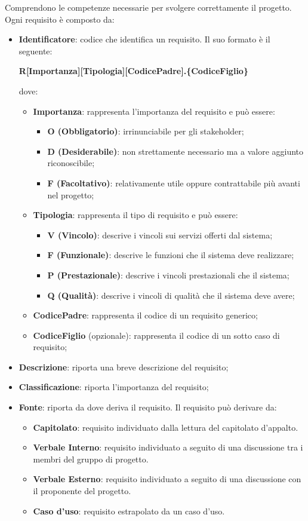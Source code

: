 Comprendono le competenze necessarie per svolgere correttamente il progetto.\\
Ogni requisito è composto da:
\begin{itemize}
\item \textbf{Identificatore}: codice che identifica un requisito. Il suo formato è il seguente:
\begin{center}
\textbf{R[Importanza][Tipologia][CodicePadre].\{CodiceFiglio\}}\\
\end{center}
dove:
\begin{itemize}
\item \textbf{Importanza}: rappresenta l'importanza del requisito e può essere:
\begin{itemize}
\item \textbf{O (Obbligatorio)}: irrinunciabile per gli stakeholder;
\item \textbf{D (Desiderabile)}: non strettamente necessario ma a valore aggiunto riconoscibile;
\item \textbf{F (Facoltativo)}: relativamente utile oppure contrattabile più avanti nel progetto;
\end{itemize}
\item \textbf{Tipologia}: rappresenta il tipo di requisito e può essere:
\begin{itemize}
\item \textbf{V (Vincolo)}: descrive i vincoli sui servizi offerti dal sistema;
\item \textbf{F (Funzionale)}: descrive le funzioni che il sistema deve realizzare;
\item \textbf{P (Prestazionale)}: descrive i vincoli prestazionali che il sistema;
\item \textbf{Q (Qualità)}: descrive i vincoli di qualità che il sistema deve avere;
\end{itemize}
\item \textbf{CodicePadre}: rappresenta il codice di un requisito generico;
\item \textbf{CodiceFiglio} (opzionale): rappresenta il codice di un sotto caso di requisito;
\end{itemize}
\item \textbf{Descrizione}: riporta una breve descrizione del requisito;
\item \textbf{Classificazione}: riporta l'importanza del requisito;
\item \textbf{Fonte}: riporta da dove deriva il requisito. Il requisito può derivare da:
\begin{itemize}
\item \textbf{Capitolato}: requisito individuato dalla lettura del capitolato d'appalto.
\item \textbf{Verbale Interno}: requisito individuato a seguito di una discussione tra i membri del gruppo di progetto.
\item \textbf{Verbale Esterno}: requisito individuato a seguito di una discussione con il proponente del progetto.
\item \textbf{Caso d'uso}: requisito estrapolato da un caso d'uso.
\end{itemize}
\end{itemize}